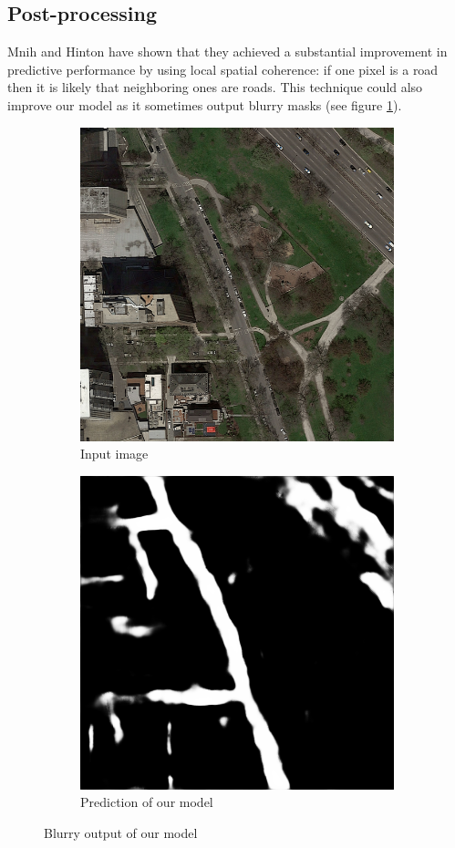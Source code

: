 \documentclass[10pt,conference,compsocconf]{IEEEtran}
\begin{document}
\subsection{Post-processing}
Mnih and Hinton \cite{post_processing} have shown that they achieved a substantial improvement in predictive performance by using local spatial coherence: if one pixel is a road then it is likely that neighboring ones are roads. This technique could also improve our model as it sometimes output blurry masks (see figure \ref{fig:blurry_output}).
\begin{figure}[ht]
    \centering
    \begin{subfigure}{0.45\linewidth}
        \centering
        \includegraphics[width=0.65\linewidth]{doc/images/blurry_input.png}
        \caption{Input image}
    \end{subfigure}
    \begin{subfigure}{0.45\linewidth}
        \centering
        \includegraphics[width=0.65\linewidth]{images/blurry_output.png}
        \caption{Prediction of our model}
    \end{subfigure}
    \caption{Blurry output of our model}
    \label{fig:blurry_output}
\end{figure}
\end{document}

